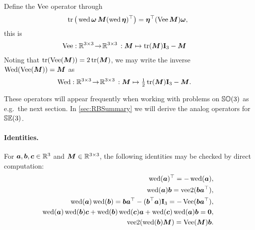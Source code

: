 Define the $\veeMatOp$ operator through
\begin{align}\label{eq:EqVeeMatOpSO3}
 \tr\big( \wedOp\tuple{\omega}\, \mat{M} (\wedOp\tuple{\eta})^\top \big) = \tuple{\eta}^\top (\veeMatOp\mat{M}) \tuple{\omega},
\end{align}
this is
\begin{align}
 \veeMatOp &: \RealNum^{3\times 3} \!\rightarrow\! \RealNum^{3\times3} \, : \mat{M} \mapsto \tr(\mat{M}) \idMat[3] - \mat{M}
\end{align} 
Noting that $\tr(\veeMatOp(\mat{M})) = 2\tr(\mat{M})$, we may write the inverse $\wedMatOp(\veeMatOp(\mat{M})) = \mat{M}$ as
\begin{align}
 \wedMatOp &: \RealNum^{3\times 3} \!\rightarrow\! \RealNum^{3\times3} \, : \mat{M} \mapsto \tfrac{1}{2}\tr(\mat{M}) \idMat[3] - \mat{M}.
\end{align}

These operators will appear frequently when working with problems on $\SpecialOrthogonalGroup(3)$ as e.g.\ the next section.
In \autoref{sec:RBSummary} we will derive the analog operators for $\SpecialEuclideanGroup(3)$.

\paragraph{Identities.}
For $\tuple{a}, \tuple{b}, \tuple{c} \in \RealNum^{3}$ and $\mat{M}\in\RealNum^{3\times3}$, the following identities may be checked by direct computation:
\begin{subequations}\label{eq:identitiesWedgeSO3}
\begin{align}
 \wedOp(\tuple{a})^\top = -\wedOp(\tuple{a}),
\\
 \wedOp(\tuple{a}) \tuple{b} = \veeTwoOp(\tuple{b} \tuple{a}^\top),
\\
 \wedOp(\tuple{a}) \wedOp(\tuple{b}) = \tuple{b} \tuple{a}^\top - (\tuple{b}^\top \tuple{a}) \idMat[3] = -\veeMatOp(\tuple{b} \tuple{a}^\top),
\\
 \wedOp(\tuple{a}) \wedOp(\tuple{b}) \tuple{c} + \wedOp(\tuple{b}) \wedOp(\tuple{c}) \tuple{a} + \wedOp(\tuple{c}) \wedOp(\tuple{a}) \tuple{b} = \tuple{0},
 \label{eq:JacobiIdentitiySO3}
\\
 \veeTwoOp(\wedOp(\tuple{b}) \mat{M}) = \veeMatOp(\mat{M}) \tuple{b}.
\end{align} 
\end{subequations}

